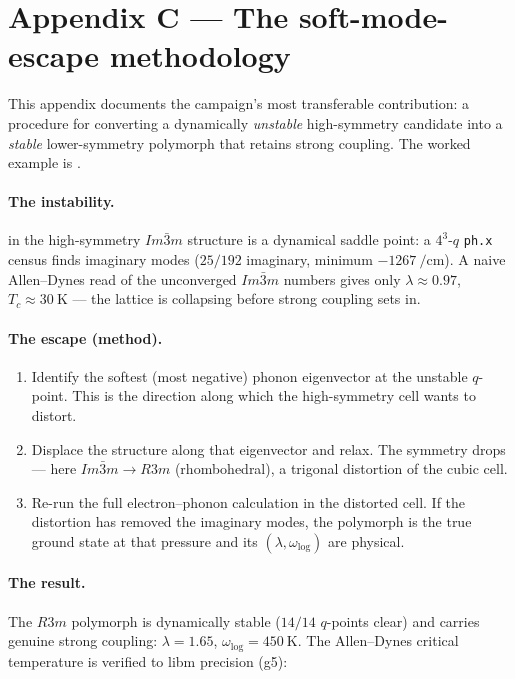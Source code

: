 \section{Appendix C --- The soft-mode-escape methodology}
\label{app:C}

This appendix documents the campaign's most transferable contribution: a
procedure for converting a dynamically \emph{unstable} high-symmetry
candidate into a \emph{stable} lower-symmetry polymorph that retains strong
coupling. The worked example is .

\paragraph{The instability.}
 in the high-symmetry $Im\bar{3}m$ structure is a dynamical saddle
point: a $4^3$-$q$ \texttt{ph.x} census finds imaginary modes ($25/192$
imaginary, minimum $-\SI{1267}{\per\centi\meter}$). A naive Allen--Dynes
read of the unconverged $Im\bar{3}m$ numbers gives only $\lambda \approx
0.97$, $T_c \approx \SI{30}{\kelvin}$ --- the lattice is collapsing before
strong coupling sets in.

\paragraph{The escape (method).}
\begin{enumerate}\itemsep0.25em
\item Identify the softest (most negative) phonon eigenvector at the
  unstable $q$-point. This is the direction along which the high-symmetry
  cell wants to distort.
\item Displace the structure along that eigenvector and relax. The symmetry
  drops --- here $Im\bar{3}m \to R3m$ (rhombohedral), a trigonal distortion
  of the cubic cell.
\item Re-run the full electron--phonon calculation in the distorted cell. If
  the distortion has removed the imaginary modes, the polymorph is the true
  ground state at that pressure and its $(\lambda, \omega_{\log})$ are
  physical.
\end{enumerate}

\paragraph{The result.}
The $R3m$  polymorph is dynamically stable ($14/14$ $q$-points
clear) and carries genuine strong coupling: $\lambda = 1.65$, $\omega_{\log}
= \SI{450}{\kelvin}$. The Allen--Dynes critical temperature is verified to
libm precision (g5):

